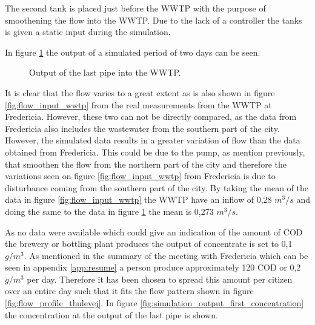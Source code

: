 The second tank is placed just before the WWTP with the purpose of smoothening the flow into the WWTP. Due to the lack of a controller the tanks is given a static input during the simulation.


In figure \ref{fig:simulation_output_first} the output of a simulated period of two days can be seen. 

\begin{figure}[H]
\centering

\caption{Output of the last pipe into the WWTP.}
\label{fig:simulation_output_first}
\end{figure}  

It is clear that the flow varies to a great extent as is also shown in figure \ref{fig:flow_input_wwtp} from the real measurements from the WWTP at Fredericia. However, these two can not be directly compared, as the data from Fredericia also includes the wastewater from the southern part of the city. However, the simulated data results in a greater variation of flow than the data obtained from Fredericia. This could be due to the pump, as mention previously, that smoothen the flow from the northern part of the city and therefore the variations seen on figure \ref{fig:flow_input_wwtp} from Fredericia is due to disturbance coming from the southern part of the city. By taking the mean of the data in figure \ref{fig:flow_input_wwtp} the WWTP have an inflow of 0,28 $m^3/s$ and doing the same to the data in figure \ref{fig:simulation_output_first} the mean is 0,273 $m^3/s$. 


 As no data were available which could give an indication of the amount of COD the brewery or bottling plant produces
the output of concentrate is set to 0,1 $g/m^3$. As mentioned in the summary of the meeting with Fredericia which can be seen in appendix \ref{app:resume} a person produce approximately 120 COD or 0,2 $g/m^3$ per day. 
Therefore it has been chosen to spread this amount per citizen over an entire day such that it fits the flow pattern shown in figure \ref{fig:flow_profile_thulevej}. In figure \ref{fig:simulation_output_first_concentration} the concentration at the output of the last pipe is shown.

